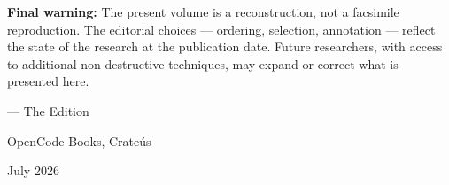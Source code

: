 \vspace{0.6em}

\noindent\textbf{Final warning:}
The present volume is a reconstruction, not a facsimile reproduction. The editorial choices --- ordering, selection, annotation --- reflect the state of the research at the publication date. Future researchers, with access to additional non-destructive techniques, may expand or correct what is presented here.

\vspace{1.2em}

\begin{flushright}
--- The Edition\par
OpenCode Books, Crateús\par
July 2026
\end{flushright}

\endgroup
\clearpage
